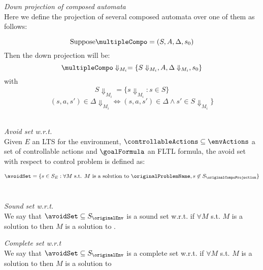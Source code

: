 \begin{definition} \label{def:downProjectionAutomata} \emph{Down projection of composed automata}\\
Here we define the projection of several composed automata over one of them as follows: 
\begin{minipage}[t]{.5\textwidth}
\begin{center}
\[\text{Suppose} \multipleCompo = (S, A, \Delta, s_0)\]
Then the down projection will be:
\[\multipleCompo\Downarrow_{M_i}=\{S\Downarrow_{M_i}, A,\Delta\Downarrow_{M_i},s_0\}\]
with
\[S\Downarrow_{M_i}=\{s\Downarrow_{M_i}: s \in S\}\]
\[(s,a,s') \in \Delta\Downarrow_{M_i} \iff (s,a,s') \in \Delta \wedge s' \in S\Downarrow_{M_i}\}\]\\
\end{center}
\end{minipage}
\end{definition}


\begin{definition} \label{def:avoidSet} \emph{Avoid set w.r.t. \originalProblem}\\
Given $E$ an LTS for the environment, $\controllableActions \subseteq \envActions$ a set of controllable actions and $\goalFormula$ an 
FLTL formula, the avoid set \avoidSet with respect to control problem \originalProblem is defined as:
\begin{minipage}[t]{.5\textwidth}
\[\avoidSet = \{s \in S_{E} : \forall M \text{ s.t. $M$ is a solution to } \originalProblemName, s \not\in S_{\originalCompoProjection}\}\]\\
\end{minipage}
\end{definition}


\begin{definition} \label{def:soundSet} \emph{Sound set w.r.t. \originalProblem}\\
We say that $\avoidSet \subseteq S_{\originalEnv}$ is a sound set w.r.t. \originalProblem 
 if $\forall M$ s.t. $M$ is a solution to \retainProblem then $M$ is a solution to \originalProblemName.
\end{definition}


\begin{definition} \label{def:completeSet} \emph{Complete set w.r.t \originalProblem}\\
We say that $\avoidSet \subseteq S_{\originalEnv}$ is a complete set w.r.t. \originalProblem 
if  $\forall M$ s.t. $M$ is a solution to \originalProblemName then $M$ is a solution to \retainProblem
\end{definition}
